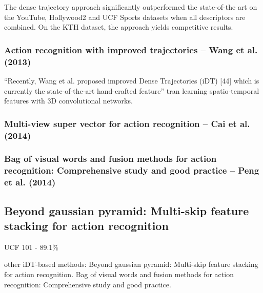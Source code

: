 The dense trajectory approach significantly outperformed the state-of-the art on the YouTube, Hollywood2 and UCF Sports datasets when all descriptors are combined.
On the KTH dataset, the approach yields competitive results.

\subsubsection{Action recognition with improved trajectories -- Wang et al. (2013)}
\cite{wang_action_2013}
``Recently, Wang et al. proposed improved Dense Trajectories (iDT) [44] which is currently the state-of-the-art hand-crafted feature'' tran learning spatio-temporal features with 3D convolutional networks.

\subsubsection{Multi-view super vector for action recognition -- Cai et al. (2014)}
\cite{cai_multi-view_2014}

\subsubsection{Bag of visual words and fusion methods for action recognition: Comprehensive study and good practice -- Peng et al. (2014)}
\cite{peng_bag_2014}

\subsection{Beyond gaussian pyramid: Multi-skip feature stacking for action recognition}
UCF 101 - 89.1\%

other iDT-based methods: Beyond gaussian pyramid: Multi-skip feature stacking for action recognition.
Bag of visual words and fusion methods for action recognition: Comprehensive study and good practice.

